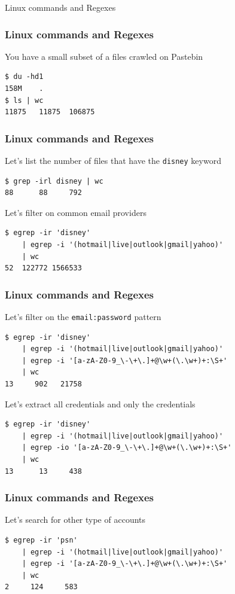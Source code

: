 \documentclass{beamer}
\begin{document}
\begin{frame}
    \vfill
    \centering
    \LARGE Linux commands and Regexes
    \vfill
\end{frame}

\begin{frame}[fragile]
    \frametitle{Linux commands and Regexes}
    You have a small subset of a files crawled on Pastebin
\begin{lstlisting}
$ du -hd1
158M    .
$ ls | wc
11875   11875  106875
\end{lstlisting}
\end{frame}

\begin{frame}[fragile]
    \frametitle{Linux commands and Regexes}
    Let's list the number of files that have the \texttt{disney} keyword
\begin{lstlisting}
$ grep -irl disney | wc
88      88     792
\end{lstlisting}

    Let's filter on common email providers
\begin{lstlisting}
$ egrep -ir 'disney'
    | egrep -i '(hotmail|live|outlook|gmail|yahoo)'
    | wc
52  122772 1566533
\end{lstlisting}
\end{frame}

\begin{frame}[fragile]
    \frametitle{Linux commands and Regexes}
    Let's filter on the \texttt{email:password} pattern
\begin{lstlisting}
$ egrep -ir 'disney'
    | egrep -i '(hotmail|live|outlook|gmail|yahoo)'
    | egrep -i '[a-zA-Z0-9_\-\+\.]+@\w+(\.\w+)+:\S+'
    | wc
13     902   21758
\end{lstlisting}

    Let's extract all credentials and only the credentials
\begin{lstlisting}
$ egrep -ir 'disney'
    | egrep -i '(hotmail|live|outlook|gmail|yahoo)'
    | egrep -io '[a-zA-Z0-9_\-\+\.]+@\w+(\.\w+)+:\S+'
    | wc
13      13     438
\end{lstlisting}
\end{frame}

\begin{frame}[fragile]
    \frametitle{Linux commands and Regexes}
    Let's search for other type of accounts
\begin{lstlisting}
$ egrep -ir 'psn'
    | egrep -i '(hotmail|live|outlook|gmail|yahoo)'
    | egrep -i '[a-zA-Z0-9_\-\+\.]+@\w+(\.\w+)+:\S+'
    | wc
2     124     583
\end{lstlisting}
\end{frame}
\end{document}
